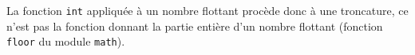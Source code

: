 La fonction \lstinline{int} appliquée à un nombre flottant procède donc à une troncature, ce n'est pas la fonction donnant la partie entière d'un nombre flottant (fonction \lstinline{floor} du module \lstinline{math}).
%
%
%
